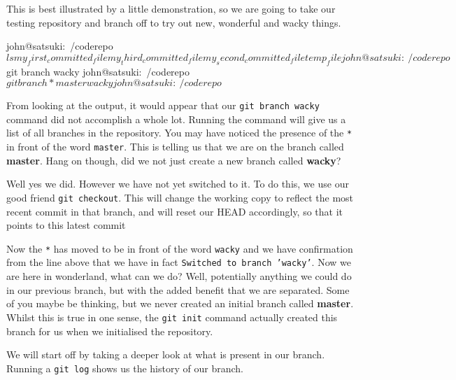 This is best illustrated by a little demonstration, so we are going to take our testing repository and branch off to try out new, wonderful and wacky things.

\begin{code}
john@satsuki:~/coderepo$ ls
my_first_committed_file   my_third_committed_file
my_second_committed_file  temp_file
john@satsuki:~/coderepo$ git branch wacky
john@satsuki:~/coderepo$ git branch
* master
  wacky
john@satsuki:~/coderepo$
\end{code}

From looking at the output, it would appear that our \texttt{git branch wacky} command did not accomplish a whole lot.
Running the  command will give us a list of all branches in the repository.
You may have noticed the presence of the \texttt{*} in front of the word \texttt{master}.
This is telling us that we are on the branch called \textbf{master}.
Hang on though, did we not just create a new branch called \textbf{wacky}?

Well yes we did.
However we have not yet switched to it.
To do this, we use our good friend \texttt{git checkout}.
This will change the working copy to reflect the most recent commit in that branch, and will reset our HEAD accordingly, so that it points to this latest commit


Now the \texttt{*} has moved to be in front of the word \texttt{wacky} and we have confirmation from the line above that we have in fact \texttt{Switched to branch 'wacky'}.
Now we are here in wonderland, what can we do? Well, potentially anything we could do in our previous branch, but with the added benefit that we are separated.
Some of you maybe be thinking, but we never created an initial branch called \textbf{master}.
Whilst this is true in one sense, the \texttt{git init} command actually created this branch for us when we initialised the repository.

We will start off by taking a deeper look at what is present in our branch.
Running a \texttt{git log} shows us the history of our branch.

